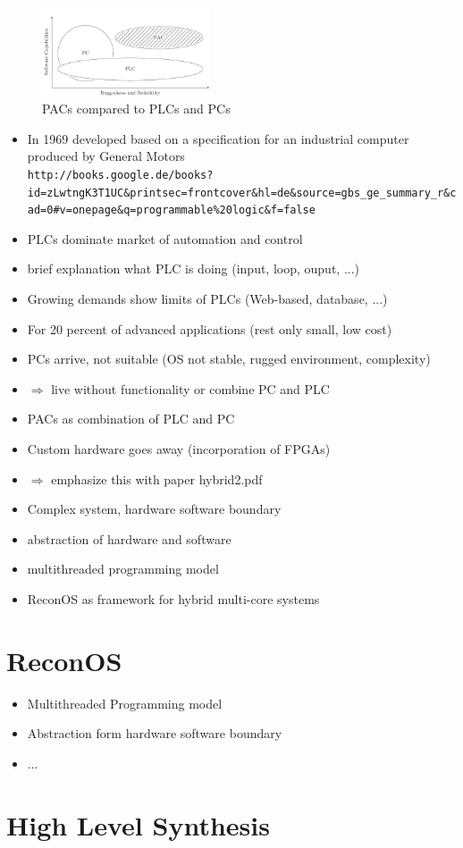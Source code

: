 \begin{figure}
	\centering
	\includegraphics[width=5cm]{../figures/pac}
	\caption{\acp{PAC} compared to \acp{PLC} and \acp{PC} \citep[adapted from][]{bel05}}
	\label{fig:pac}
\end{figure}
\begin{itemize}
\item In 1969 developed based on a specification for an industrial computer  produced by General Motors \citep{par99}\\
\lstinline{http://books.google.de/books?id=zLwtngK3T1UC&printsec=frontcover&hl=de&source=gbs_ge_summary_r&cad=0#v=onepage&q=programmable%20logic&f=false}
\item \acp{PLC} dominate market of automation and control
\item brief explanation what PLC is doing (input, loop, ouput, ...)
\item Growing demands show limits of \acp{PLC} (Web-based, database, ...)
\item For 20 percent of advanced applications (rest only small, low cost)

\item PCs arrive, not suitable (OS not stable, rugged environment, complexity)
\item $\Rightarrow$ live without functionality or combine PC and PLC
\item \acp{PAC} as combination of PLC and PC
\item Custom hardware goes away (incorporation of FPGAs)
\item $\Rightarrow$ emphasize this with paper hybrid2.pdf
\item Complex system, hardware software boundary
\item abstraction of hardware and software
\item multithreaded programming model
\item ReconOS as framework for hybrid multi-core systems
\end{itemize}

\section{ReconOS}
\begin{itemize}
\item Multithreaded Programming model
\item Abstraction form hardware software boundary
\item ...
\end{itemize}

\section{High Level Synthesis}